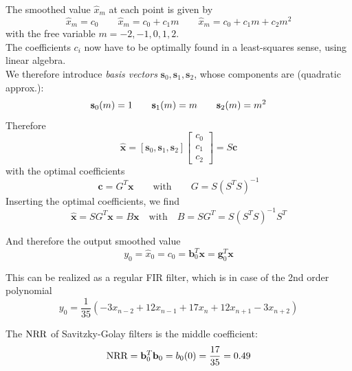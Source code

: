 The smoothed value $\hat{x}_m$ at each point is given by
\begin{equation*}
	\hat{x}_m = c_0 \qquad \hat{x}_m = c_0 + c_1 m \qquad \hat{x}_m = c_0 + c_1 m + c_2 m^2
\end{equation*}
with the free variable $m = -2,-1,0,1,2$. \\

The coefficients $c_i$ now have to be
optimally found in a least-squares sense, using linear algebra. \\

We  therefore introduce \emph{basis vectors}
$\mathbf{s}_0, \mathbf{s}_1, \mathbf{s}_2$, whose components are (quadratic approx.):
\begin{equation*}
	\mathbf{s}_0(m) = 1 \qquad \mathbf{s}_1(m) = m \qquad \mathbf{s}_2(m) = m^2 \\
\end{equation*}
Therefore
\begin{equation*}
	\hat{\mathbf{x}} = \left[\mathbf{s}_0,\mathbf{s}_1,\mathbf{s}_2\right]
	\begin{bmatrix}c_0\\c_1\\c_2\end{bmatrix} = S\mathbf{c}
\end{equation*}
with the optimal coefficients
\begin{equation*}
	\mathbf{c} = G^T \mathbf{x} \qquad \text{with} \qquad G = S \left(S^T S \right)^{-1}
\end{equation*}
Inserting the optimal coefficients, we find
\begin{equation*}
	\hat{\mathbf{x}} = S G^T \mathbf{x} = B \mathbf{x} \quad \text{with} \quad B = S G^T = S \left(S^T S\right)^{-1} S^T
\end{equation*}

And therefore the output smoothed value
\begin{equation*}
	y_0 = \hat{x}_0 = c_0 = \mathbf{b}_0^T \mathbf{x} = \mathbf{g}_0^T \mathbf{x}
\end{equation*}

This can be realized as a regular FIR filter, which is in case of the 2nd order
polynomial
\begin{equation*}
	y_0 = \frac{1}{35} \left( -3 x_{n-2} + 12 x_{n-1} + 17 x_n + 12 x_{n+1} - 3 x_{n+2}\right)
\end{equation*}

The $\operatorname{\text{NRR}}$ of Savitzky-Golay filters is the middle coefficient:
\begin{equation*}
	\operatorname{\text{NRR}} = \mathbf{b}_0^T \mathbf{b}_0 = b_0(0) = \frac{17}{35} = 0.49
\end{equation*}

